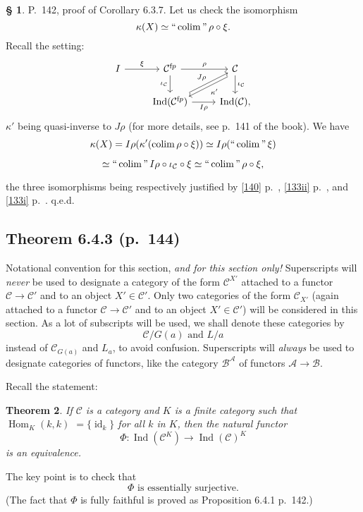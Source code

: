 \documentclass[12pt]{article}%
\newtheorem{thm}{Theorem}%
\theoremstyle{remark}
\theoremstyle{definition}
\newtheorem{s}[thm]{\S}%
\newcommand{\A}{\mathcal A}
\newcommand{\B}{\mathcal B}
\newcommand{\C}{\mathcal C}
\DeclareMathOperator*{\colim}{colim}
\DeclareMathOperator*{\ic}{``\colim"}
\DeclareMathOperator{\id}{id}
\DeclareMathOperator{\Hom}{Hom}%
\DeclareMathOperator{\Ind}{Ind}
\begin{document}
%

\begin{s} P.~142, proof of Corollary 6.3.7. Let us check the isomorphism 
$$
\kappa(X)\simeq\ic\rho\circ\xi. 
$$ 
Recall the setting:
$$
\begin{tikzcd}
I\ar{r}{\xi}&\C^{\text fp}\ar{d}[swap]{\iota_\C}\ar{r}{\rho}&\C\ar[yshift=-.9ex]{dl}{\kappa'}\ar{d}{\iota_\C}\\ 
{}&\Ind(\C^{\text fp})\ar{ur}{J\rho}\ar{r}[swap]{I\rho}&\Ind(\C),
\end{tikzcd}
$$ 
$\kappa'$ being quasi-inverse to $J\rho$ (for more details, see p.~141 of the book). We have 
$$
\kappa(X)=I\rho(\kappa'(\colim\rho\circ\xi))\simeq I\rho(\ic\xi)
$$

$$
\simeq\ic I\rho\circ\iota_\C\circ\xi\simeq\ic\rho\circ\xi, 
$$ 

\noindent the three isomorphisms being respectively justified by \eqref{140} p.~\pageref{140}, \eqref{133ii} p.~\pageref{133ii}, and \eqref{133i} p.~\pageref{133i}. q.e.d.
\end{s}


\subsection{Theorem 6.4.3 (p.~144)}

Notational convention for this section, {\em and for this section only!} Superscripts will {\em never} be used to designate a category of the form $\C^{X'}$ attached to a functor $\C\to\C'$ and to an object $X'\in\C'$. Only two categories of the form $\C_{X'}$ (again attached to a functor $\C\to\C'$ and to an object $X'\in\C'$) will be considered in this section. As a lot of subscripts will be used, we shall denote these categories by 
%
\begin{equation}\label{slice}
\C/G(a)\text{ and }L/a
\end{equation}
%
instead of $\C_{G(a)}$ and $L_a$, to avoid confusion. Superscripts will {\em always} be used to designate categories of functors, like the category $\B^\A$ of functors $\A\to\B$. 

Recall the statement: 
%
\begin{thm}\label{643}
If $\C$ is a category and $K$ is a finite category such that $\Hom_K(k,k)$ $=\{\id_k\}$ for all $k$ in $K$, then the natural functor 
$$
\Phi:\Ind(\C^K)\to\Ind(\C)^K
$$ 
is an equivalence.
\end{thm}

The key point is to check that 
%
\begin{equation}\label{es} 
\Phi\text{ is essentially surjective.} 
\end{equation} 
%
(The fact that $\Phi$ is fully faithful is proved as Proposition 6.4.1 p.~142.) 
\end{document}
